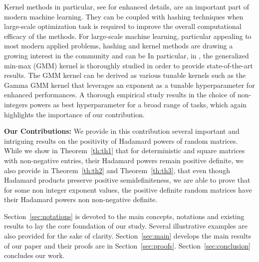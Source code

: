 \documentclass[conference,letterpaper]{IEEEtran}
\numberwithin{equation}{section}
\begin{document}
Kernel methods in particular, see \cite{scholkopf2002learning} for enhanced details, are an important part of modern machine learning. 
They can be coupled with hashing techniques when large-scale optimization task is required to improve the overall computational efficacy of the methods.
For large-scale machine learning, particular appealing to most modern applied problems, hashing and kernel methods are drawing a growing interest in the community and can be 
In particular, in \cite{li2018several}, the generalized min-max (GMM) kernel is thoroughly studied in order to provide state-of-the-art results. 
The GMM kernel can be derived as various tunable kernels such as the Gamma GMM kernel that leverages an exponent as a tunable hyperparameter for enhanced performances.
A thorough empirical study results in the choice of non-integers powers as best hyperparameter for a broad range of tasks, which again highlights the importance of our contribution.



\textbf{Our Contributions: }
We provide in this contribution several important and intriguing results on the positivity of Hadamard powers of random matrices. 
While we show in Theorem~\ref{th:th1} that for deterministic and square matrices with non-negative entries, their Hadamard powers remain positive definite, we also provide in Theorem~\ref{th:th2} and Theorem~\ref{th:th3}, that even though Hadamard products preserve positive semidefiniteness, we are able to prove that for some non integer exponent values, the positive definite random matrices have their Hadamard powers non non-negative definite.


Section~\ref{sec:notations} is devoted to the main concepts, notations and existing results to lay the core foundation of our study.
Several illustrative examples are also provided for the sake of clarity.
Section~\ref{sec:main} develops the main results of our paper and their proofs are in Section~\ref{sec:proofs}.
Section~\ref{sec:conclusion} concludes our work.
\end{document}

